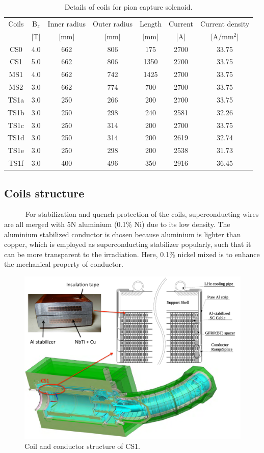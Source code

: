 \begin{table}[H]
 \centering
 \begin{tabular}{ccccccc} \hline \hline
  Coils & B$_z$ & Inner radius & Outer radius & Length & Current & Current density \\
   & [T] & [mm] & [mm] & [mm] & [A] & [A/mm$^2$] \\ \hline
  CS0 & 4.0 & 662 & 806 & 175 & 2700 & 33.75 \\
  CS1 & 5.0 & 662 & 806 & 1350 & 2700 & 33.75 \\
  MS1 & 4.0 & 662 & 742 & 1425 & 2700 & 33.75 \\
  MS2 & 3.0 & 662 & 774 & 700 & 2700 & 33.75 \\
  TS1a & 3.0 & 250 & 266 & 200 & 2700 & 33.75 \\
  TS1b & 3.0 & 250 & 298 & 240 & 2581 & 32.26 \\
  TS1c & 3.0 & 250 & 314 & 200 & 2700 & 33.75 \\
  TS1d & 3.0 & 250 & 314 & 200 & 2619 & 32.74 \\
  TS1e & 3.0 & 250 & 298 & 200 & 2538 & 31.73 \\
  TS1f & 3.0 & 400 & 496 & 350 & 2916 & 36.45 \\ \hline \hline
 \end{tabular}
 \caption{Details of coils for pion capture solenoid.}
 \label{magfldcs}
\end{table}


\subsection{Coils structure}
~~~~~~For stabilization and quench protection of the coils, superconducting wires are all merged with 5N aluminium (0.1\% Ni) due to its low density.
The aluminium stabilized conductor is chosen because aluminium is lighter than copper, which is employed as superconducting stabilizer popularly, such that it can be more transparent to the irradiation.
Here, 0.1\% nickel mixed is to enhance the mechanical property of conductor.
\begin{figure}[H]
 \centering
 \includegraphics[scale=0.45]{chapter2/fig/coil.pdf}
 \caption{ Coil and conductor structure of CS1.}
 \label{cssrtu}
\end{figure}

